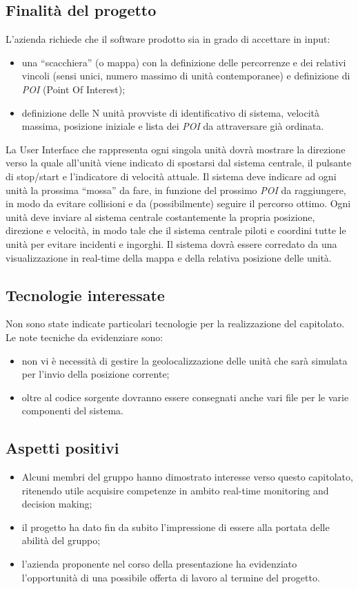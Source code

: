 \subsection{Finalità del progetto}
L’azienda richiede che il software prodotto sia in grado di accettare in input:
\begin{itemize}
\item una “scacchiera” (o mappa) con la definizione delle percorrenze e dei relativi vincoli (sensi unici, numero massimo di unità contemporanee) e definizione di \textit{POI} (Point Of Interest);
\item definizione delle N unità provviste di identificativo di sistema, velocità massima, posizione iniziale e lista dei \textit{POI} da attraversare già ordinata.
\end{itemize}
La User Interface che rappresenta ogni singola unità dovrà mostrare la direzione verso la quale all'unità viene indicato di spostarsi dal sistema centrale, il pulsante di stop/start e l’indicatore di velocità attuale.
Il sistema deve indicare ad ogni unità la prossima “mossa” da fare, in funzione del prossimo \textit{POI} da raggiungere, in modo da evitare collisioni e da  (possibilmente) seguire il percorso ottimo.
Ogni unità deve inviare al sistema centrale costantemente la propria posizione, direzione e velocità, in modo tale che il sistema centrale piloti e coordini tutte le unità per evitare incidenti e ingorghi. 
Il sistema dovrà essere corredato da una visualizzazione in real-time della mappa e della relativa posizione delle unità. 

\subsection{Tecnologie interessate}
Non sono state indicate particolari tecnologie per la realizzazione del capitolato. Le note tecniche da evidenziare sono:
\begin{itemize}
\item non vi è necessità di gestire la geolocalizzazione delle unità che sarà simulata per l’invio della posizione corrente;
\item oltre al codice sorgente dovranno essere consegnati anche vari file  per le varie componenti del sistema.
\end{itemize}	

\subsection{Aspetti positivi}
\begin{itemize}
\item Alcuni membri del gruppo hanno dimostrato interesse verso questo capitolato, ritenendo utile acquisire competenze in ambito real-time monitoring and decision making;
\item il progetto ha dato fin da subito l’impressione di essere alla portata delle abilità del gruppo;
\item l’azienda proponente nel corso della presentazione ha evidenziato l’opportunità di una possibile offerta di lavoro al termine del progetto.
\end{itemize}	

